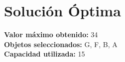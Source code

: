 \documentclass{article}
\begin{document}
\section*{Solución Óptima}
\textbf{Valor máximo obtenido:} 34\\
\textbf{Objetos seleccionados:} G, F, B, A\\
\textbf{Capacidad utilizada:} 15\\
\end{document}
